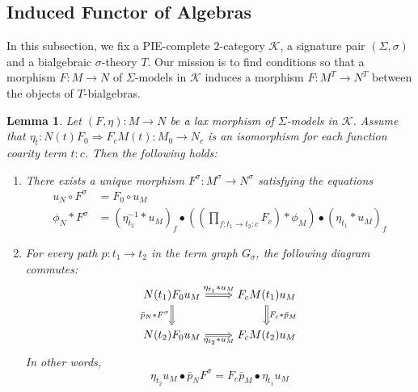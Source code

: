 \documentclass[11pt]{article}
\theoremstyle{plain}
\newtheorem{lemma}[theorem]{Lemma}
\theoremstyle{definition}
\numberwithin{equation}{section}
\newcommand{\K}{\mathcal{K}}
\begin{document}
\subsection{Induced Functor of Algebras}

In this subsection, we fix a PIE-complete $2$-category $\K$, a signature pair $(\Sigma,\sigma)$ and a bialgebraic $\sigma$-theory $T$. Our mission is to find conditions so that a morphism $F\colon M\to N$ of $\Sigma$-models in $\K$ induces a morphism $F\colon M^T\to N^T$ between the objects of $T$-bialgebras.

\begin{lemma}\label{lem:morphism_between_inserters}
   Let $(F,\eta) \colon M \to N$ be a lax morphism of $\Sigma$-models in $\K$. Assume that $\eta_t\colon N(t)F_0\Rightarrow F_c M(t)\colon M_0\to N_c$ is an isomorphism for each function coarity term $t\colon c$. Then the following holds:
   \begin{enumerate}
       \item There exists a unique morphism $F^\sigma\colon M^\sigma\to N^\sigma$ satisfying the equations
       \begin{align}
           u_N \circ F^\sigma 
           &= F_0 \circ u_M \nonumber \\
           \phi_N * F^\sigma
           &= (\eta_{t_2}^{-1}*u_M)_f \bullet ((\prod_{f\colon t_1\to t_2\colon c} F_{c}) * \phi_M) \bullet (\eta_{t_1}*u_M)_f\label{eq:2}
   \end{align}
       \item For every path $p\colon t_1\to t_2$ in the term graph $G_\sigma$, the following diagram commutes:
       $$
\begin{tikzcd}
N(t_1)F_0u_M \arrow[r, "\eta_{t_1}*u_M", Rightarrow] \arrow[d, "\bar{p}_N*F^\sigma"', Rightarrow] & F_cM(t_1)u_M \arrow[d, "F_c*\bar{p}_M", Rightarrow] \\
N(t_2)F_0u_M \arrow[r, "\eta_{t_2}*u_M"', Rightarrow]                                             & F_cM(t_2)u_M                                       
\end{tikzcd}
$$
In other words, 
\begin{equation}\label{eq:3}
\eta_{t_2}u_M\bullet \bar{p}_NF^\sigma = F_c\bar{p}_M\bullet \eta_{t_1}u_M
\end{equation}

   \end{enumerate}
\end{lemma}
\end{document}

